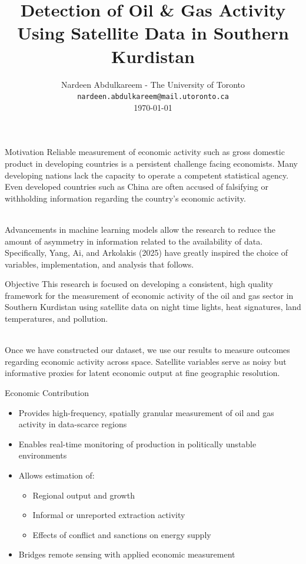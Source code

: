 \documentclass[10pt]{beamer}
\title{\Large Detection of Oil \& Gas Activity Using Satellite Data in Southern Kurdistan}
\author{\scriptsize Nardeen Abdulkareem - The University of Toronto \\ 
        \texttt{nardeen.abdulkareem@mail.utoronto.ca} \\ 
        \today}
\date{\vspace{-15mm}}
\begin{document}
\begin{frame}
  \vspace{1.2cm}
  \titlepage
\end{frame}
\begin{frame}{Motivation}
Reliable measurement of economic activity such as gross domestic product in developing
countries is a persistent challenge facing economists. Many developing nations lack the capacity to operate a competent statistical agency. Even developed countries such as China are often accused of falsifying or withholding information regarding the country's economic activity. \\\


Advancements in machine learning models allow the research to reduce the amount of asymmetry in information related to the availability of data. Specifically, Yang, Ai, and Arkolakis (2025) have greatly inspired the choice of variables, implementation, and analysis that follows.
\end{frame}

\begin{frame}{Objective}
This research is focused on developing a consistent, high quality framework for the measurement of economic activity of the oil and gas sector in Southern Kurdistan using satellite data on night time lights, heat signatures, land temperatures, and pollution. \\\ 


Once we have constructed our dataset, we use our results to measure outcomes regarding economic activity across space. Satellite variables serve as noisy but informative proxies for latent economic output at fine geographic resolution. 
\end{frame}

\begin{frame}{Economic Contribution}
\begin{itemize}
\item Provides high-frequency, spatially granular measurement of oil and gas activity in data-scarce regions
\item Enables real-time monitoring of production in politically unstable environments
\item Allows estimation of:
\begin{itemize}
\item Regional output and growth
\item Informal or unreported extraction activity
\item Effects of conflict and sanctions on energy supply
\end{itemize}
\item Bridges remote sensing with applied economic measurement
\end{itemize}
\end{frame}
\end{document}
